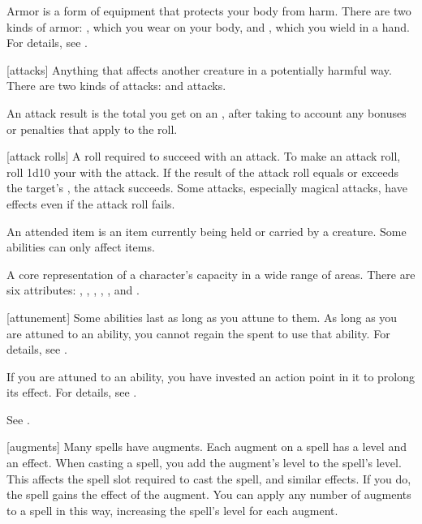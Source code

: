  Armor is a form of equipment that protects your body from harm.
There are two kinds of armor: , which you wear on your body, and , which you wield in a hand.
For details, see .

[attacks] Anything that affects another creature in a potentially harmful way. There are two kinds of attacks:  and  attacks.

 An attack result is the total you get on an , after taking to account any bonuses or penalties that apply to the roll.

[attack rolls] A roll required to succeed with an attack.
To make an attack roll, roll 1d10 \add your  with the attack.
If the result of the attack roll equals or exceeds the target's , the attack succeeds.
Some attacks, especially magical attacks, have effects even if the attack roll fails.

 An attended item is an item currently being held or carried by a creature.
Some abilities can only affect  items.

 A core representation of a character's capacity in a wide range of areas. There are six attributes: , , , , , and .

[attunement] Some abilities last as long as you attune to them.
As long as you are attuned to an ability, you cannot regain the  spent to use that ability.
For details, see .

 If you are attuned to an ability, you have invested an action point in it to prolong its effect.
For details, see .

 See .

[augments] Many spells have augments.
Each augment on a spell has a level and an effect.
When casting a spell, you add the augment's level to the spell's level.
This affects the spell slot required to cast the spell, and similar effects.
If you do, the spell gains the effect of the augment.
You can apply any number of augments to a spell in this way, increasing the spell's level for each augment.

